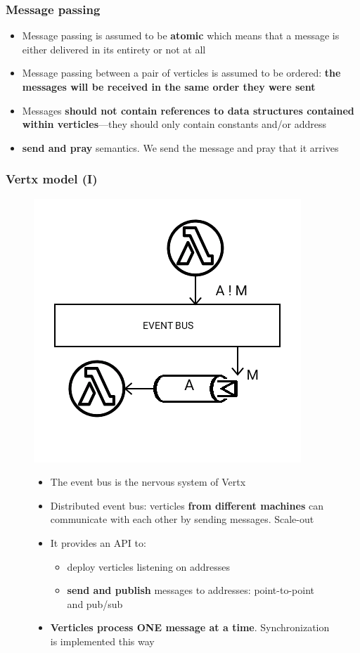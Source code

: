 \documentclass{beamer}
\begin{document}
\begin{frame}
\frametitle{Message passing}
\begin{itemize}
\item<1-> Message passing is assumed to be \textbf{atomic} which means that a message is either delivered in its entirety or not at all
\item<2-> Message passing between a pair of verticles is assumed to be ordered: \textbf{the messages will be received in the same order they were sent}
\item<3-> Messages \textbf{should not contain references to data structures contained within verticles}—they should only contain constants and/or address
\item<4->\textbf{send and pray} semantics. We send the message and pray that it arrives
\end{itemize}
\end{frame}

\begin{frame}
\frametitle{Vertx model (I)}
\begin{figure}
\includegraphics[scale=0.3]{images/vertx-model-1.png}
\begin{itemize}
\item<1-> The event bus  is the nervous system of Vertx
\item<2-> Distributed event bus: verticles \textbf{from different machines} can communicate with each other by sending messages. Scale-out
\item<3-> It provides an API to:
\begin{itemize}
        \item<4-> deploy verticles listening on addresses
        \item<5-> \textbf{send and publish} messages to addresses: point-to-point and pub/sub 
\end{itemize}        
\item<6->  \textbf{Verticles process ONE message at a time}. Synchronization is implemented this way
\end{itemize}
\end{figure}
\end{frame}
\end{document}
